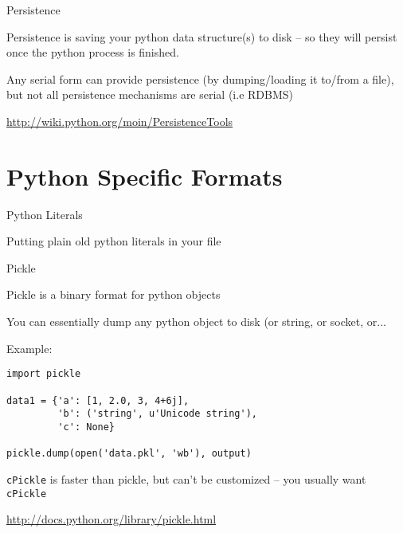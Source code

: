 \documentclass{beamer}
\begin{document}
\begin{frame}[fragile]{Persistence}

\vfill
{\Large Persistence is saving your python data structure(s) to disk -- so they
will persist once the python process is finished.}

\vfill
{\Large Any serial form can provide persistence (by dumping/loading it to/from
a file), but not all persistence mechanisms are serial (i.e RDBMS)}


\vfill
\url{http://wiki.python.org/moin/PersistenceTools}
\end{frame} 


\section{Python Specific Formats}

\begin{frame}[fragile]{Python Literals}

\vfill
{\Large Putting plain old python literals in your file}

\end{frame} 

\begin{frame}[fragile]{Pickle}

\vfill
{\Large Pickle is a binary format for python objects}

\vfill
{\Large You can essentially dump any python object to disk (or string, or socket, or...}

Example:
\begin{verbatim}
import pickle

data1 = {'a': [1, 2.0, 3, 4+6j],
         'b': ('string', u'Unicode string'),
         'c': None}

pickle.dump(open('data.pkl', 'wb'), output)
\end{verbatim}

{\Large \verb|cPickle| is faster than pickle, but
can't be customized -- you usually want \verb|cPickle|} 

\url{http://docs.python.org/library/pickle.html}
\end{frame} 
\end{document}
